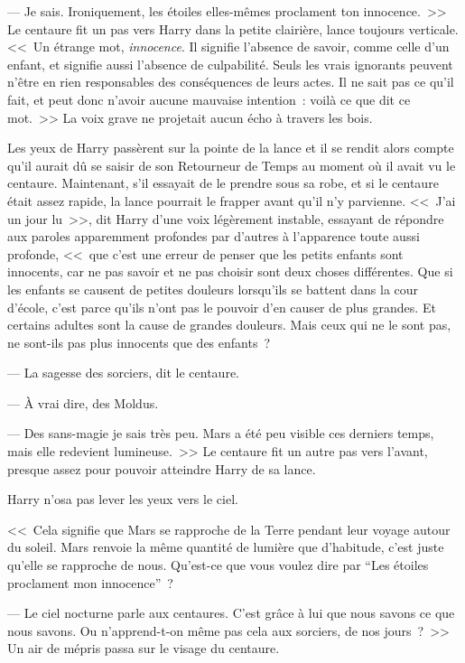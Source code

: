 --- Je sais. Ironiquement, les étoiles elles-mêmes proclament ton innocence.~>> Le centaure fit un pas vers Harry dans la petite clairière, lance toujours verticale. <<~Un étrange mot, \emph{innocence}. Il signifie l'absence de savoir, comme celle d'un enfant, et signifie aussi l'absence de culpabilité. Seuls les vrais ignorants peuvent n'être en rien responsables des conséquences de leurs actes. Il ne sait pas ce qu'il fait, et peut donc n'avoir aucune mauvaise intention~: voilà ce que dit ce mot.~>> La voix grave ne projetait aucun écho à travers les bois.

Les yeux de Harry passèrent sur la pointe de la lance et il se rendit alors compte qu'il aurait dû se saisir de son Retourneur de Temps au moment où il avait vu le centaure. Maintenant, s'il essayait de le prendre sous sa robe, et si le centaure était assez rapide, la lance pourrait le frapper avant qu'il n'y parvienne. <<~J'ai un jour lu~>>, dit Harry d'une voix légèrement instable, essayant de répondre aux paroles apparemment profondes par d'autres à l'apparence toute aussi profonde, <<~que c'est une erreur de penser que les petits enfants sont innocents, car ne pas savoir et ne pas choisir sont deux choses différentes. Que si les enfants se causent de petites douleurs lorsqu'ils se battent dans la cour d'école, c'est parce qu'ils n'ont pas le pouvoir d'en causer de plus grandes. Et certains adultes sont la cause de grandes douleurs. Mais ceux qui ne le sont pas, ne sont-ils pas plus innocents que des enfants~?

--- La sagesse des sorciers, dit le centaure.

--- À vrai dire, des Moldus.

--- Des sans-magie je sais très peu. Mars a été peu visible ces derniers temps, mais elle redevient lumineuse.~>> Le centaure fit un autre pas vers l'avant, presque assez pour pouvoir atteindre Harry de sa lance.

Harry n'osa pas lever les yeux vers le ciel.

<<~Cela signifie que Mars se rapproche de la Terre pendant leur voyage autour du soleil. Mars renvoie la même quantité de lumière que d'habitude, c'est juste qu'elle se rapproche de nous. Qu'est-ce que vous voulez dire par “Les étoiles proclament mon innocence”~?

--- Le ciel nocturne parle aux centaures. C'est grâce à lui que nous savons ce que nous savons. Ou n'apprend-t-on même pas cela aux sorciers, de nos jours~?~>> Un air de mépris passa sur le visage du centaure.

